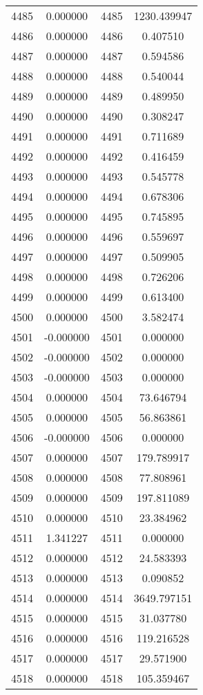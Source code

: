 \documentclass[12pt]{article}
\begin{document}
\begin{longtable}{@{}cccc@{}}
4485 & 0.000000 & 4485 & 1230.439947 \\
4486 & 0.000000 & 4486 & 0.407510 \\
4487 & 0.000000 & 4487 & 0.594586 \\
4488 & 0.000000 & 4488 & 0.540044 \\
4489 & 0.000000 & 4489 & 0.489950 \\
4490 & 0.000000 & 4490 & 0.308247 \\
4491 & 0.000000 & 4491 & 0.711689 \\
4492 & 0.000000 & 4492 & 0.416459 \\
4493 & 0.000000 & 4493 & 0.545778 \\
4494 & 0.000000 & 4494 & 0.678306 \\
4495 & 0.000000 & 4495 & 0.745895 \\
4496 & 0.000000 & 4496 & 0.559697 \\
4497 & 0.000000 & 4497 & 0.509905 \\
4498 & 0.000000 & 4498 & 0.726206 \\
4499 & 0.000000 & 4499 & 0.613400 \\
4500 & 0.000000 & 4500 & 3.582474 \\
4501 & -0.000000 & 4501 & 0.000000 \\
4502 & -0.000000 & 4502 & 0.000000 \\
4503 & -0.000000 & 4503 & 0.000000 \\
4504 & 0.000000 & 4504 & 73.646794 \\
4505 & 0.000000 & 4505 & 56.863861 \\
4506 & -0.000000 & 4506 & 0.000000 \\
4507 & 0.000000 & 4507 & 179.789917 \\
4508 & 0.000000 & 4508 & 77.808961 \\
4509 & 0.000000 & 4509 & 197.811089 \\
4510 & 0.000000 & 4510 & 23.384962 \\
4511 & 1.341227 & 4511 & 0.000000 \\
4512 & 0.000000 & 4512 & 24.583393 \\
4513 & 0.000000 & 4513 & 0.090852 \\
4514 & 0.000000 & 4514 & 3649.797151 \\
4515 & 0.000000 & 4515 & 31.037780 \\
4516 & 0.000000 & 4516 & 119.216528 \\
4517 & 0.000000 & 4517 & 29.571900 \\
4518 & 0.000000 & 4518 & 105.359467 \\

\end{longtable}
\end{document}
